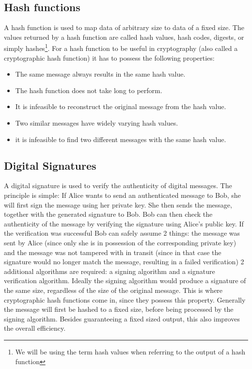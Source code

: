 \subsection{Hash functions} 
\label{subsec:hash_functions}

A hash function is used to map data of arbitrary size to data of a fixed size. The values returned by a hash function are called hash values, hash codes, digests, or simply hashes\footnote{We will be using the term hash values when referring to the output of a hash function}. For a hash function to be useful in cryptography (also called a cryptographic hash function) it has to possess the following properties\cite{wiki:Hash}:

\begin{itemize}
	\item The same message always results in the same hash value.
	\item The hash function does not take long to perform.
	\item It is infeasible to reconstruct the original message from the hash value.
	\item Two similar messages have widely varying hash values.
	\item it is infeasible to find two different messages with the same hash value.
\end{itemize}

\subsection{Digital Signatures} 
\label{subsec:digital_signature}

A digital signature is used to verify the authenticity of digital messages. The principle is simple: If Alice wants to send an authenticated message to Bob, she will first sign the message using her private key. She then sends the message, together with the generated signature to Bob. Bob can then check the authenticity of the message by verifying the signature using Alice's public key. If the verification was successful Bob can safely assume 2 things: the message was sent by Alice (since only she is in possession of the corresponding private key) and the message was not tampered with in transit (since in that case the signature would no longer match the message, resulting in a failed verification) 2 additional algorithms are required: a signing algorithm and a signature verification algorithm. Ideally the signing algorithm would produce a signature of the same size, regardless of the size of the original message. This is where cryptographic hash functions come in, since they possess this property. Generally the message will first be hashed to a fixed size, before being processed by the signing algorithm. Besides guaranteeing a fixed sized output, this also improves the overall efficiency.\cite{wiki:DigitalSignature}

